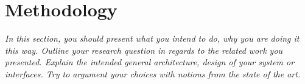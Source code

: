 \chapter{Methodology}
\label{ch:method}

\emph{In this section, you should present what you intend to do, why you are doing it this way. Outline your research question in regards to the related work you presented. Explain the intended general architecture, design of your system or interfaces. Try to argument your choices with notions from the state of the art.}


